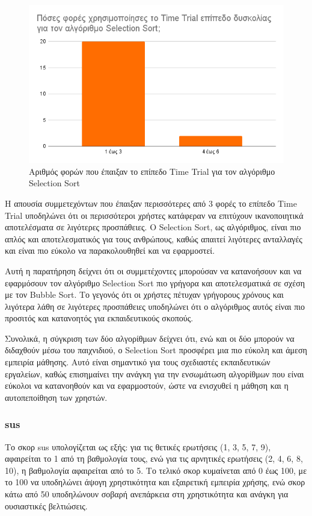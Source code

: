 \begin{figure}[H]
    \centering
    \includegraphics[width=0.7\linewidth]{sections/5/2/images/selectionsort_timetrial_usages}
    \caption{Αριθμός φορών που έπαιξαν το επίπεδο Time Trial για τον αλγόριθμο Selection Sort}
    \label{fig:selectionsort_timetrial_usages}
\end{figure}

Η απουσία συμμετεχόντων που έπαιξαν περισσότερες από 3 φορές το επίπεδο Time Trial υποδηλώνει ότι οι περισσότεροι χρήστες κατάφεραν να επιτύχουν ικανοποιητικά αποτελέσματα σε λιγότερες προσπάθειες. Ο Selection Sort, ως αλγόριθμος, είναι πιο απλός και αποτελεσματικός για τους ανθρώπους, καθώς απαιτεί λιγότερες ανταλλαγές και είναι πιο εύκολο να παρακολουθηθεί και να εφαρμοστεί.

Αυτή η παρατήρηση δείχνει ότι οι συμμετέχοντες μπορούσαν να κατανοήσουν και να εφαρμόσουν τον αλγόριθμο Selection Sort πιο γρήγορα και αποτελεσματικά σε σχέση με τον Bubble Sort. Το γεγονός ότι οι χρήστες πέτυχαν γρήγορους χρόνους και λιγότερα λάθη σε λιγότερες προσπάθειες υποδηλώνει ότι ο αλγόριθμος αυτός είναι πιο προσιτός και κατανοητός για εκπαιδευτικούς σκοπούς.

Συνολικά, η σύγκριση των δύο αλγορίθμων δείχνει ότι, ενώ και οι δύο μπορούν να διδαχθούν μέσω του παιχνιδιού, ο Selection Sort προσφέρει μια πιο εύκολη και άμεση εμπειρία μάθησης. Αυτό είναι σημαντικό για τους σχεδιαστές εκπαιδευτικών εργαλείων, καθώς επισημαίνει την ανάγκη για την ενσωμάτωση αλγορίθμων που είναι εύκολοι να κατανοηθούν και να εφαρμοστούν, ώστε να ενισχυθεί η μάθηση και η αυτοπεποίθηση των χρηστών.


\subsubsection{\acrshort{sus}}

Το σκορ \acrshort{sus} υπολογίζεται ως εξής: για τις θετικές ερωτήσεις (1, 3, 5, 7, 9), αφαιρείται το 1 από τη βαθμολογία τους, ενώ για τις αρνητικές ερωτήσεις (2, 4, 6, 8, 10), η βαθμολογία αφαιρείται από το 5. Το τελικό σκορ κυμαίνεται από 0 έως 100, με το 100 να υποδηλώνει άψογη χρηστικότητα και εξαιρετική εμπειρία χρήσης, ενώ σκορ κάτω από 50 υποδηλώνουν σοβαρή ανεπάρκεια στη χρηστικότητα και ανάγκη για ουσιαστικές βελτιώσεις.

